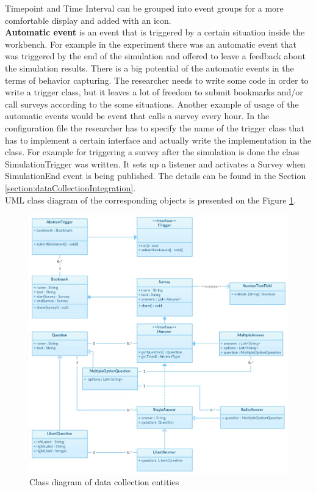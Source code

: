 Timepoint and Time Interval can be grouped into event groups for a more comfortable display and added with an icon.\\
 
\textbf{Automatic event} is an event that is triggered by a certain situation inside the workbench. For example in the experiment there was an automatic event that was triggered by the end of the simulation and offered to leave a feedback about the simulation results. There is a big potential of the automatic events in the terms of behavior capturing. The researcher needs to write some code in order to write a trigger class, but it leaves a lot of freedom to submit bookmarks and/or call surveys according to the some situations. Another example of usage of the automatic events would be event that calls a survey every hour. In the configuration file the researcher has to specify the name of the trigger class that has to implement a certain interface and actually write the implementation in the class. For example for triggering a survey after the simulation is done the class SimulationTrigger was written. It sets up a listener and activates a Survey when SimulationEnd event is being published. The details can be found in the  Section \ref{section:dataCollectionIntegration}.\\

UML class diagram of the corresponding objects is presented on the Figure \ref{fig:data_collection_class_diagram}.\\

 \begin{figure}[htb]
 \centering
\includegraphics[width=400pt]{figures/data_collection_class_diagram.jpg}
\caption{Class diagram of data collection entities}
\label{fig:data_collection_class_diagram}
 \end{figure}


